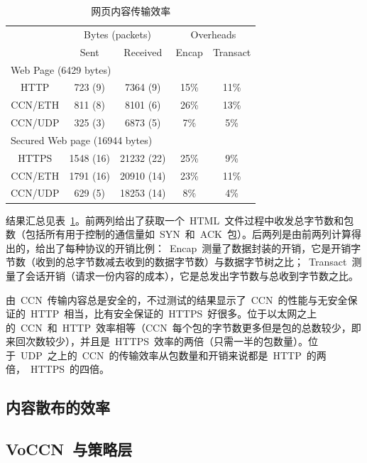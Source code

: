 {
\renewcommand{\arraystretch}{1.2}
\renewcommand{\tabcolsep}{0.2cm}
\begin{table}[htdp]
\begin{center}
\begin{tabular}{|c|c|c|c|c|}
\hline
\space & \multicolumn{2}{c|}{Bytes (packets)} & \multicolumn{2}{c|}{Overheads}  \\
\space & Sent & Received & Encap & Transact \\
\hline
\multicolumn{5}{|l|}{Web Page (6429 bytes)} \\
\hline
HTTP & 723 (9) & 7364 (9) & 15\% & 11\% \\
CCN/ETH & 811 (8) & 8101 (6) & 26\% & 13\% \\
CCN/UDP & 325 (3) & 6873 (5) & 7\% & 5\% \\
\hline
\multicolumn{5}{|l|}{Secured Web page (16944 bytes)} \\
\hline
HTTPS & 1548 (16) & 21232 (22) & 25\% & 9\% \\
CCN/ETH & 1791 (16) & 20910 (14) & 23\% & 11\% \\
CCN/UDP & 629 (5) & 18253 (14) & 8\% & 4\% \\
\hline
\end{tabular}
\caption{网页内容传输效率}
\label{web_performance}
\end{center}
\end{table}
}

结果汇总见表~\ref{web_performance}。前两列给出了获取一个~HTML~文件过程中收发总字节数和包数（包括所有用于控制的通信量如~SYN~和~ACK~包）。后两列是由前两列计算得出的，给出了每种协议的开销比例：~Encap~测量了数据封装的开销，它是开销字节数（收到的总字节数减去收到的数据字节数）与数据字节树之比；~Transact~测量了会话开销（请求一份内容的成本），它是总发出字节数与总收到字节数之比。

由~CCN~传输内容总是安全的，不过测试的结果显示了~CCN~的性能与无安全保证的~HTTP~相当，比有安全保证的~HTTPS~好很多。位于以太网之上的~CCN~和~HTTP~效率相等（CCN~每个包的字节数更多但是包的总数较少，即来回次数较少），并且是~HTTPS~效率的两倍（只需一半的包数量）。位于~UDP~之上的~CCN~的传输效率从包数量和开销来说都是~HTTP~的两倍，~HTTPS~的四倍。
\subsection{内容散布的效率}
\label{sec:6.2}

\subsection{VoCCN~与策略层}
\label{sec:6.3}

